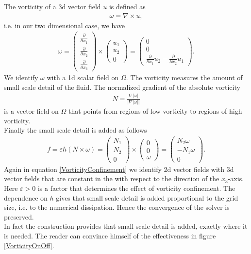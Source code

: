 \documentclass[a4paper,10pt,oneside,final,german,openbib,pdftex,titlepage]{scrbook}
\begin{document}
The vorticity of a 3d vector field $u$ is defined as
\begin{align*}
	\omega = \nabla \times u,
\end{align*}
i.e. in our two dimensional case, we have
\begin{align*}
	\omega = \left( \begin{matrix}
	\frac{\partial}{\partial x_1} \\ \frac{\partial}{\partial x_2} \\ \frac{\partial}{\partial x_3}
	\end{matrix} \right) \times 
	\left( \begin{matrix}
	u_1 \\ u_2 \\ 0
	\end{matrix} \right) = \left( \begin{matrix}
	 0\\ 0 \\ \frac{\partial}{\partial x_1} u_2 - \frac{\partial}{\partial x_2} u_1 
	\end{matrix} \right).
\end{align*}
We identify $\omega$ with a 1d scalar field on $\Omega$. The vorticity measures the amount of small scale detail of the fluid. The normalized gradient of the absolute vorticity
\begin{align*}
	N = \frac{\nabla |\omega |}{|\nabla  |\omega ||}
\end{align*}
is a vector field on $\Omega$ that points from regions of low vorticity to regions of high vorticity.\\
Finally the small scale detail is added as follows
\begin{align}
	f = \varepsilon h (N\times \omega ) = \left( \begin{matrix}
	N_1\\ N_2 \\0
	\end{matrix}  \right) \times \left( \begin{matrix} 0\\ 0\\ \omega \end{matrix} \right) = \left( \begin{matrix}
	N_2 \omega \\ -N_1 \omega \\ 0
	\end{matrix} \right). \label{VorticityConfinement}
\end{align}
Again in equation \ref{VorticityConfinement} we identify 2d vector fields with 3d vector fields that are constant in the with respect to the direction of the $x_3$-axis.
Here $\varepsilon >0$ is a factor that determines the effect of vorticity confinement. The dependence on $h$ gives that small scale detail is added proportional to the grid size, i.e. to the numerical dissipation. Hence the convergence of the solver is preserved.\\
In fact the construction provides that small scale detail is added, exactly where it is needed. The reader can convince himself of the effectiveness in figure \ref{VorticityOnOff}.
\end{document}

